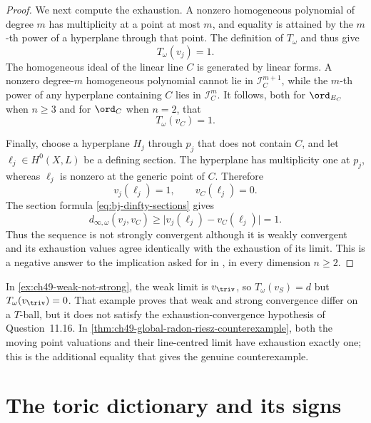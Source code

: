 \begin{proof}
We next compute the exhaustion.  A nonzero homogeneous polynomial of degree
$m$ has multiplicity at a point at most $m$, and equality is attained by
the $m$-th power of a hyperplane through that point.  The definition of
$T_\omega$ and \cite[Lemma~4.46]{BJ22} thus give
\[
                              T_\omega(v_j)=1.
\tag{49.17d}\label{eq:ch49-pn-T-point}
\]
The homogeneous ideal of the linear line $C$ is generated by linear
forms.  A nonzero degree-$m$ homogeneous polynomial cannot lie in
$\mathcal I_C^{m+1}$, while the $m$-th power of any hyperplane
containing $C$ lies in $\mathcal I_C^m$.  It follows, both for
$\ord_{E_C}$ when $n\ge3$ and for $\ord_C$ when $n=2$, that
\[
                              T_\omega(v_C)=1.
\tag{49.17e}\label{eq:ch49-pn-T-center}
\]

Finally, choose a hyperplane $H_j$ through $p_j$ that does not contain
$C$, and let $\ell_j\in H^0(X,L)$ be a defining section.  The hyperplane
has multiplicity one at $p_j$, whereas $\ell_j$ is nonzero at the
generic point of $C$.  Therefore
\[
                          v_j(\ell_j)=1,
                          \qquad v_C(\ell_j)=0.
\tag{49.17f}\label{eq:ch49-pn-moving-hyperplane}
\]
The section formula \eqref{eq:bj-dinfty-sections} gives
\[
 d_{\infty,\omega}(v_j,v_C)
 \ge \lvert v_j(\ell_j)-v_C(\ell_j)\rvert=1.
\tag{49.17g}\label{eq:ch49-pn-strong-gap}
\]
Thus the sequence is not strongly convergent although it is weakly
convergent and its exhaustion values agree identically with the exhaustion
of its limit.  This is a negative answer to the implication asked for in
\cite[Question~11.16]{BJ22}, in every dimension $n\ge2$.
\end{proof}

\begin{remark}
\label{rem:ch49-curve-versus-radon-riesz}
In \cref{ex:ch49-weak-not-strong}, the weak limit is $v_{\triv}$, so
$T_\omega(v_S)=d$ but $T_\omega(v_{\triv})=0$.  That example proves
that weak and strong convergence differ on a $T$-ball, but it does not
satisfy the exhaustion-convergence hypothesis of Question~11.16.  In
\cref{thm:ch49-global-radon-riesz-counterexample}, both the moving point
valuations and their line-centred limit have exhaustion exactly one; this is
the additional equality that gives the genuine counterexample.
\end{remark}

\section{The toric dictionary and its signs}
\label{sec:ch49-toric}

